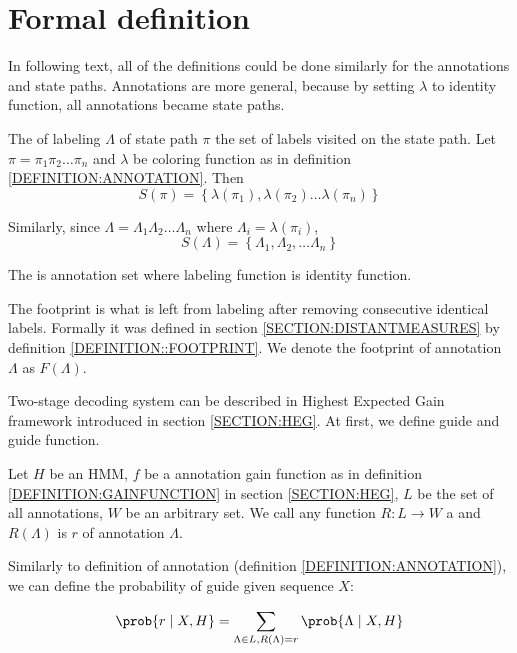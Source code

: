 \section{Formal definition}

\begin{note}
In following text, all of the definitions could be done similarly for the
annotations and state paths. Annotations are more general, because by setting
$\lambda$ to identity function, all annotations became state paths.
\end{note}

\begin{definition}
The  of labeling
$\Lambda$ of state path $\pi$ the set of labels visited on the state path.
Let $\pi = \pi_1\pi_2\dots \pi_n$ and $\lambda$ be coloring function as in definition
\ref{DEFINITION:ANNOTATION}. Then 
\[S(\pi) = \left\{\lambda(\pi_1), \lambda(\pi_2)\dots\lambda(\pi_n)\right\}\]

Similarly, since $\Lambda = \Lambda_1\Lambda_2\dots \Lambda_n$ where $\Lambda_i
= \lambda(\pi_i)$, 
\[S(\Lambda) =
\left\{\Lambda_1,\Lambda_2,\dots\Lambda_n\right\}\]

The  is annotation set where labeling function is identity
function.\label{DEFINITION:ANNOTATION_SET}
\end{definition}

The footprint is what is left from labeling after removing consecutive identical
labels. Formally it was defined in section \ref{SECTION:DISTANTMEASURES} by
definition \ref{DEFINITION::FOOTPRINT}.  We denote the footprint of annotation
$\Lambda$ as $F(\Lambda)$.

Two-stage decoding system can be described in Highest Expected Gain framework
introduced in section \ref{SECTION:HEG}. At first, we define guide and guide
function.

\begin{definition}
Let $H$ be an HMM, $f$ be a annotation gain function as in definition
\ref{DEFINITION:GAINFUNCTION} in section \ref{SECTION:HEG}, $L$ be the set of
all annotations, $W$ be an arbitrary set. We call any function
$R:L\to W$ a  and $R(\Lambda)$ is
 $r$ of annotation $\Lambda$.

Similarly to definition of annotation (definition \ref{DEFINITION:ANNOTATION}),
we can define the probability of guide given sequence $X$:

\begin{equation}
\prob{r\mid X, H} = \sum_{\Lambda \in L, R(\Lambda) = r} \prob{\Lambda\mid X, H}
\end{equation}
\end{definition}

